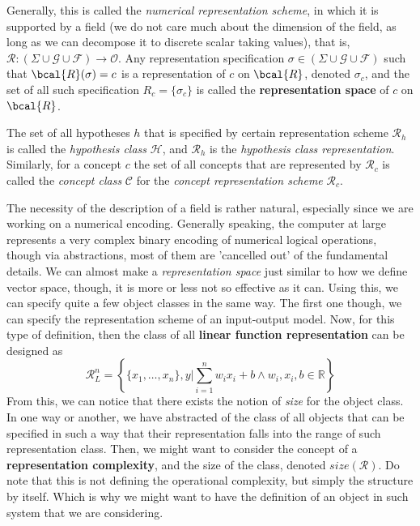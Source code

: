 Generally, this is called the \textit{numerical representation scheme}, in which it is supported by a field (we do not care much about the dimension of the field, as long as we can decompose it to discrete scalar taking values), that is, $\bm{\mathcal{R}}:(\Sigma \cup \mathcal{G}\cup \mathcal{F})\to \mathcal{O}$. Any representation specification $\sigma\in (\Sigma \cup \mathcal{G}\cup \mathcal{F})$ such that $\bcal{R}(\sigma) = c$ is a representation of $c$ on $\bcal{R}$, denoted $\sigma_{c}$, and the set of all such specification $R_{c}=\{\sigma_{c}\}$ is called the \textbf{representation space} of $c$ on $\bcal{R}$.

The set of all hypotheses $h$ that is specified by certain representation scheme $\bm{\mathcal{R}}_{h}$ is called the \textit{hypothesis class} $\mathcal{H}$, and $\bm{\mathcal{R}}_{h}$ is the \textit{hypothesis class representation}. Similarly, for a concept $c$ the set of all concepts that are represented by $\bm{\mathcal{R}}_{c}$ is called the \textit{concept class} $\mathcal{C}$ for the \textit{concept representation scheme} $\bm{\mathcal{R}}_{c}$.

The necessity of the description of a field is rather natural, especially since we are working on a numerical encoding. Generally speaking, the computer at large represents a very complex binary encoding of numerical logical operations, though via abstractions, most of them are 'cancelled out' of the fundamental details. We can almost make a \textit{representation space} just similar to how we define vector space, though, it is more or less not so effective as it can.
Using this, we can specify quite a few object classes in the same way. The first one though, we can specify the representation scheme of an input-output model. Now, for this type of definition, then the class of all \textbf{linear function representation} can be designed as 
\begin{equation}
    \bm{\mathcal{R}}_{L}^{n} = \left\{ \{x_{1},\dots,x_{n}\}, y \Bigg| \sum_{i=1}^{n}w_{i}x_{i} + b \land w_{i}, x_{i}, b \in \mathbb{R} \right\}
\end{equation}
From this, we can notice that there exists the notion of \textit{size} for the object class. In one way or another, we have abstracted of the class of all objects that can be specified in such a way that their representation falls into the range of such representation class. Then, we might want to consider the concept of a \textbf{representation complexity}, and the size of the class, denoted $size(\bm{\mathcal{R}})$. Do note that this is not defining the operational complexity, but simply the structure by itself. Which is why we might want to have the definition of an object in such system that we are considering.


